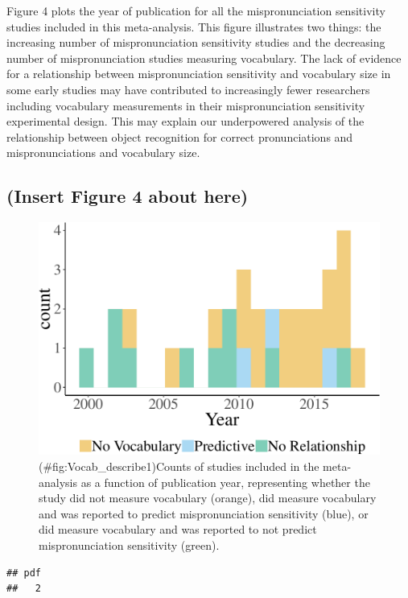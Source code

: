 \documentclass[man]{apa6}
\theoremstyle{definition}
\theoremstyle{definition}
\theoremstyle{definition}
\theoremstyle{remark}
\begin{document}
Figure 4 plots the year of publication for all the mispronunciation
sensitivity studies included in this meta-analysis. This figure
illustrates two things: the increasing number of mispronunciation
sensitivity studies and the decreasing number of mispronunciation
studies measuring vocabulary. The lack of evidence for a relationship
between mispronunciation sensitivity and vocabulary size in some early
studies may have contributed to increasingly fewer researchers including
vocabulary measurements in their mispronunciation sensitivity
experimental design. This may explain our underpowered analysis of the
relationship between object recognition for correct pronunciations and
mispronunciations and vocabulary size.

\subsection{(Insert Figure 4 about
here)}\label{insert-figure-4-about-here}

\begin{figure}
\centering
\includegraphics{Paper_Analyses_files/figure-latex/Vocab_describe1-1.pdf}
\caption{(\#fig:Vocab\_describe1)Counts of studies included in the
meta-analysis as a function of publication year, representing whether
the study did not measure vocabulary (orange), did measure vocabulary
and was reported to predict mispronunciation sensitivity (blue), or did
measure vocabulary and was reported to not predict mispronunciation
sensitivity (green).}
\end{figure}

\begin{verbatim}
## pdf 
##   2
\end{verbatim}
\end{document}
